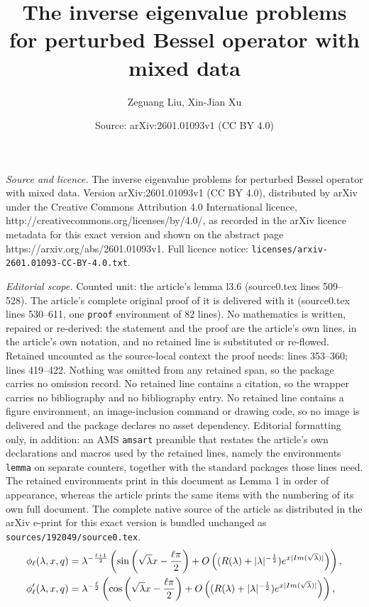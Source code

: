 \documentclass[10pt,a4paper]{amsart}
\title{The inverse eigenvalue problems for perturbed Bessel operator with mixed data}
\author{Zeguang Liu, Xin-Jian Xu}
\date{Source: arXiv:2601.01093v1 (CC BY 4.0)}
\begin{document}
\maketitle

\noindent\emph{Source and licence.} The inverse eigenvalue problems for perturbed Bessel operator with mixed data. Version arXiv:2601.01093v1 (CC BY 4.0), distributed by arXiv under the Creative Commons Attribution 4.0 International licence, http://creativecommons.org/licenses/by/4.0/, as recorded in the arXiv licence metadata for this exact version and shown on the abstract page https://arxiv.org/abs/2601.01093v1. Full licence notice: \texttt{licenses/arxiv-2601.01093-CC-BY-4.0.txt}.\par\smallskip

\noindent\textit{Editorial scope.} Counted unit: the article's lemma l3.6 (source0.tex lines 509--528). The article's complete original proof of it is delivered with it (source0.tex lines 530--611, one \texttt{proof} environment of 82 lines). No mathematics is written, repaired or re-derived: the statement and the proof are the article's own lines, in the article's own notation, and no retained line is substituted or re-flowed.  Retained uncounted as the source-local context the proof needs: lines 353--360; lines 419--422.  Nothing was omitted from any retained span, so the package carries no omission record.  No retained line contains a citation, so the wrapper carries no bibliography and no bibliography entry.  No retained line contains a figure environment, an image-inclusion command or drawing code, so no image is delivered and the package declares no asset dependency.  Editorial formatting only, in addition: an AMS \texttt{amsart} preamble that restates the article's own declarations and macros used by the retained lines, namely the environments \texttt{lemma} on separate counters, together with the standard packages those lines need.  The retained environments print in this document as Lemma 1 in order of appearance, whereas the article prints the same items with the numbering of its own full document.  The complete native source of the article as distributed in the arXiv e-print for this exact version is bundled unchanged as \texttt{sources/192049/source0.tex}.
\begin{align}
\phi_{\ell}(\lambda, x, q)
&=\lambda^{-\frac{\ell+1}{2}}
\left(\sin \left(\sqrt{\lambda} x-\frac{\ell \pi}{2}\right)+O\left((\textnormal{R}(\lambda)+|\lambda|^{-\frac{1}{2}}) e^{x| \textnormal{Im}(\sqrt{\lambda}) \mid}\right)\right),\label{e1.5}\\
\phi_{\ell}^{\prime}(\lambda, x, q)
&=\lambda^{-\frac{\ell}{2}}
\left(\cos \left(\sqrt{\lambda} x-\frac{\ell \pi}{2}\right)+O\left((\textnormal{R}(\lambda)+|\lambda|^{-\frac{1}{2}}) e^{x|\textnormal{Im}(\sqrt{\lambda})|}\right)\right),\label{e1.6}
\end{align}
\end{document}
